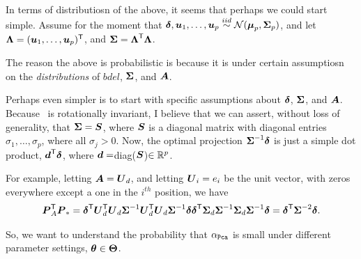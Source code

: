 \documentclass[10pt]{article}
\begin{document}
In terms of distributiosn of the above, it seems that perhaps we could start simple.
Assume for the moment that $\boldsymbol{\delta},\boldsymbol{u}_1,\ldots,\boldsymbol{u}_p \overset{iid}{\sim} \mathcal{N}(\boldsymbol{\mu}_p, \boldsymbol{\Sigma}_p)$, and let $\boldsymbol{\Lambda}=(\boldsymbol{u}_1,\ldots,\boldsymbol{u}_p)^{\mathsf{T}}$, and $\boldsymbol{\Sigma} = \boldsymbol{\Lambda}^{\mathsf{T}} \boldsymbol{\Lambda}$.  

The reason the above is probabilistic is because it is under certain assumptiosn on the \emph{distributions} of $bdel$, $\boldsymbol{\Sigma}$, and $\boldsymbol{A}$.   


Perhaps even simpler is to start with specific assumptions about $\boldsymbol{\delta}$, $\boldsymbol{\Sigma}$, and $\boldsymbol{A}$. Because \Lda~is rotationally invariant, I believe that we can assert, without loss of generality, that $\boldsymbol{\Sigma}=\boldsymbol{S}$, where $\boldsymbol{S}$ is a diagonal matrix with diagonal entries $\sigma_1,\ldots, \sigma_p$, where all $\sigma_j > 0$.
Now, the optimal projection $\boldsymbol{\Sigma}^{-1} \boldsymbol{\delta}$ is just a simple dot product,  $\boldsymbol{d}^{\mathsf{T}} \boldsymbol{\delta}$, where $\boldsymbol{d}=$diag($\boldsymbol{S}$)$\in \mathbb{R}^p$.


For example, letting $\boldsymbol{A}=\boldsymbol{U}_d$, and letting $\boldsymbol{U}_i=e_i$ be the unit vector, with zeros everywhere except a one in the $i^{th}$ position,  we have
\begin{align*}
\bP_A\T \bP_* %
= \bdel\T \bU_d\T \bU_d \bSig^{-1} \bU_d\T \bU_d \bSig^{-1} \bdel %
\bdel\T \bSig_d \bSig^{-1} \bSig_d \bSig^{-1} \bdel %
= \bdel\T \bSig^{-2} \bdel.
\end{align*}






So, we want to understand the probability that $\alpha_{{\sc \texttt{Pca}}}$ is small under different parameter settings, $\boldsymbol{\theta} \in \boldsymbol{\Theta}$.  





\clearpage


\end{document}

